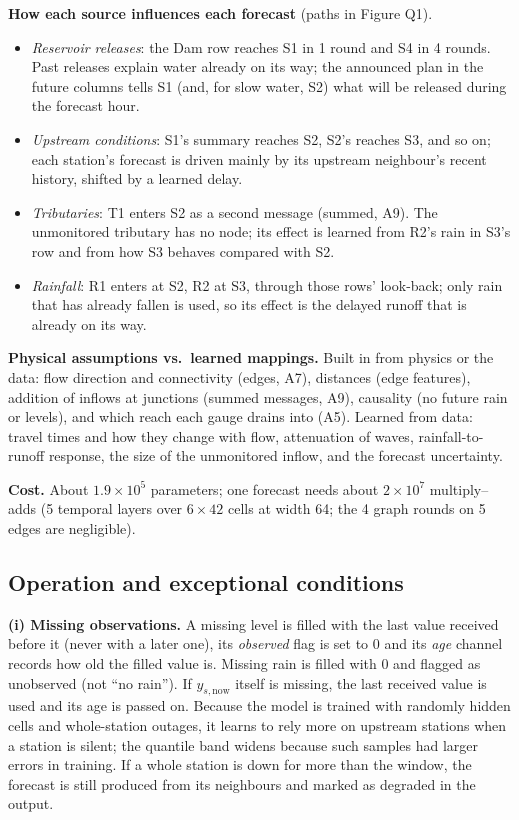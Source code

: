 \textbf{How each source influences each forecast} (paths in Figure Q1).
\begin{itemize}
\item \emph{Reservoir releases}: the Dam row reaches S1 in 1 round and S4 in 4 rounds. Past releases explain water already on its way; the announced plan in the future columns tells S1 (and, for slow water, S2) what will be released during the forecast hour.
\item \emph{Upstream conditions}: S1's summary reaches S2, S2's reaches S3, and so on; each station's forecast is driven mainly by its upstream neighbour's recent history, shifted by a learned delay.
\item \emph{Tributaries}: T1 enters S2 as a second message (summed, A9). The unmonitored tributary has no node; its effect is learned from R2's rain in S3's row and from how S3 behaves compared with S2.
\item \emph{Rainfall}: R1 enters at S2, R2 at S3, through those rows' look-back; only rain that has already fallen is used, so its effect is the delayed runoff that is already on its way.
\end{itemize}

\textbf{Physical assumptions vs.\ learned mappings.} Built in from physics or the data: flow direction and connectivity (edges, A7), distances (edge features), addition of inflows at junctions (summed messages, A9), causality (no future rain or levels), and which reach each gauge drains into (A5). Learned from data: travel times and how they change with flow, attenuation of waves, rainfall-to-runoff response, the size of the unmonitored inflow, and the forecast uncertainty.

\textbf{Cost.} About $1.9\times10^5$ parameters; one forecast needs about $2\times10^{7}$ multiply--adds (5 temporal layers over $6\times42$ cells at width 64; the 4 graph rounds on 5 edges are negligible).

\subsection{Operation and exceptional conditions}

\textbf{(i) Missing observations.} A missing level is filled with the last value received before it (never with a later one), its \emph{observed} flag is set to 0 and its \emph{age} channel records how old the filled value is. Missing rain is filled with 0 and flagged as unobserved (not ``no rain''). If $y_{s,\mathrm{now}}$ itself is missing, the last received value is used and its age is passed on. Because the model is trained with randomly hidden cells and whole-station outages, it learns to rely more on upstream stations when a station is silent; the quantile band widens because such samples had larger errors in training. If a whole station is down for more than the window, the forecast is still produced from its neighbours and marked as degraded in the output.

